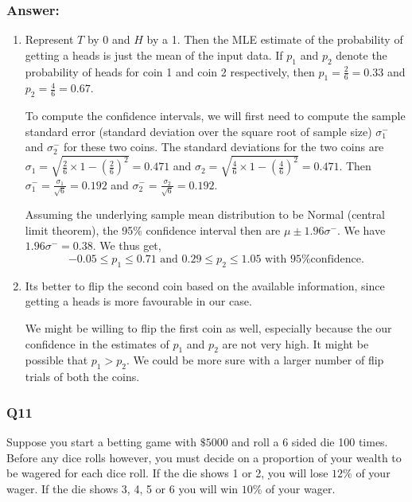 \documentclass[a4paper, 10pt]{article}
\begin{document}
\subsubsection*{Answer:}
\begin{enumerate}
\item Represent $T$ by 0 and $H$ by a 1. Then the MLE estimate of the probability of getting a heads is just the mean of the input data. If $p_1$ and $p_2$ denote the probability of heads for coin 1 and coin 2 respectively, then $p_1 = \frac{2}{6} = 0.33$ and $p_2 = \frac{4}{6} = 0.67$.

  To compute the confidence intervals, we will first need to compute the sample standard error (standard deviation over the square root of sample size) $\sigma^-_1$ and $\sigma^-_2$ for these two coins. The standard deviations for the two coins are $\sigma_1 = \sqrt{\frac{2}{6}\times1 - \left(\frac{2}{6}\right)^2} = 0.471$ and $\sigma_2 = \sqrt{\frac{4}{6}\times1 - \left(\frac{4}{6}\right)^2} = 0.471$. Then $\sigma^-_1 = \frac{\sigma_1}{\sqrt{6}} = 0.192$ and $\sigma^-_2 = \frac{\sigma_2}{\sqrt{6}} = 0.192$.

  Assuming the underlying sample mean distribution to be Normal (central limit theorem), the 95\% confidence interval then are $\mu \pm 1.96 \sigma^-$. We have $1.96 \sigma^- = 0.38$. We thus get,
  \begin{equation*}
    -0.05 \leq p_1 \leq 0.71 \text{ and } 0.29 \leq p_2 \leq 1.05 \text{ with 95\% confidence.}
  \end{equation*}
  
\item Its better to flip the second coin based on the available information, since getting a heads is more favourable in our case.

  We might be willing to flip the first coin as well, especially because the our confidence  in the estimates of $p_1$ and $p_2$ are not very high. It might be possible that $p_1 > p_2$. We could be more sure with a larger number of flip trials of both the coins.
\end{enumerate}
  

\subsubsection*{Q11}
Suppose you start a betting game with $\$5000$ and roll a 6 sided die 100 times. Before any dice rolls however, you must decide on a proportion of your wealth to be wagered for each dice roll. If the die shows 1 or 2, you will lose $12\%$ of your wager. If the die shows 3, 4, 5 or 6 you will win $10\%$ of your wager.
\end{document}
